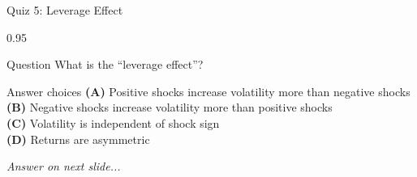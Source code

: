 \documentclass[9pt, aspectratio=169, t]{beamer}
\begin{document}
\begin{frame}{Quiz 5: Leverage Effect}
    \begin{cminipage}{0.95\textwidth}
    \begin{alertblock}{Question}
        What is the ``leverage effect''?
    \end{alertblock}

    \vspace{0.4cm}

    \begin{block}{Answer choices}
        \textcolor{MainBlue}{\textbf{(A)}} Positive shocks increase volatility more than negative shocks\\[3pt]
        \textcolor{MainBlue}{\textbf{(B)}} Negative shocks increase volatility more than positive shocks\\[3pt]
        \textcolor{MainBlue}{\textbf{(C)}} Volatility is independent of shock sign\\[3pt]
        \textcolor{MainBlue}{\textbf{(D)}} Returns are asymmetric
    \end{block}

    \vspace{0.5cm}

    \begin{center}
        \textit{Answer on next slide...}
    \end{center}
    \end{cminipage}
\end{frame}
\end{document}
